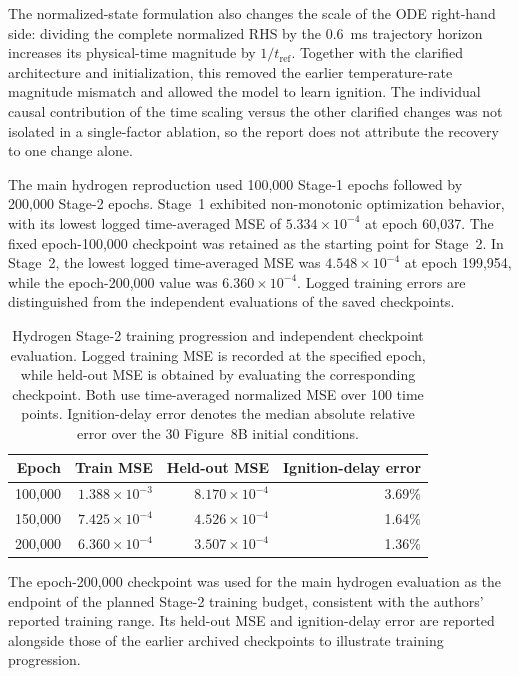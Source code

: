 \documentclass[11pt,a4paper]{article}
\begin{document}
The normalized-state formulation also changes the scale of the ODE right-hand side: dividing the complete normalized RHS by the 0.6~ms trajectory horizon increases its physical-time magnitude by $1/t_{\mathrm{ref}}$. Together with the clarified architecture and initialization, this removed the earlier temperature-rate magnitude mismatch and allowed the model to learn ignition. The individual causal contribution of the time scaling versus the other clarified changes was not isolated in a single-factor ablation, so the report does not attribute the recovery to one change alone.


The main hydrogen reproduction used 100,000 Stage-1
epochs followed by 200,000 Stage-2 epochs.
Stage~1 exhibited non-monotonic optimization
behavior, with its lowest logged time-averaged MSE
of $5.334\times10^{-4}$ at epoch 60,037.
The fixed epoch-100,000 checkpoint was retained as the
starting point for Stage~2. In Stage~2, the lowest logged time-averaged MSE
was $4.548\times10^{-4}$ at epoch 199,954,
while the epoch-200,000 value was
$6.360\times10^{-4}$. Logged training errors are
distinguished from the independent evaluations
of the saved checkpoints.


\begin{table}[htbp]
\centering
\small
\caption{Hydrogen Stage-2 training progression
and independent checkpoint evaluation.
Logged training MSE is recorded at the specified
epoch, while held-out MSE is obtained by evaluating
the corresponding checkpoint. Both use
time-averaged normalized MSE over 100 time points. Ignition-delay error denotes the median
absolute relative error over the 30
Figure~8B initial conditions.
}
\label{tab:hydrogen_checkpoints}
\begin{tabular}{@{}rrrr@{}}
\toprule
\textbf{Epoch} &
\textbf{Train MSE} &
\textbf{Held-out MSE} &
\textbf{Ignition-delay error} \\
\midrule
100,000 & $1.388\times10^{-3}$ &
       $8.170\times10^{-4}$ & 3.69\% \\
150,000 & $7.425\times10^{-4}$ &
       $4.526\times10^{-4}$ & 1.64\% \\
200,000 & $6.360\times10^{-4}$ &
       $3.507\times10^{-4}$ & 1.36\% \\
\bottomrule
\end{tabular}
\end{table}


The epoch-200,000 checkpoint was used for
the main hydrogen evaluation as the endpoint
of the planned Stage-2 training budget,
consistent with the authors' reported
training range. Its held-out MSE and
ignition-delay error are reported alongside
those of the earlier archived checkpoints
to illustrate training progression.
\end{document}
